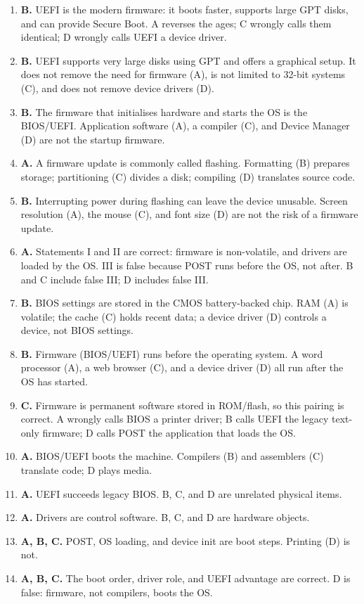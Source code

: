\documentclass[11pt]{article}
\begin{document}
\begin{enumerate}[label=\textbf{Q\arabic*.}, leftmargin=*]
  and application are running, so it is not a BIOS function. Running POST
  (A), initialising hardware (B), and loading the OS (C) are all BIOS jobs.
\item \textbf{B.} UEFI is the modern firmware: it boots faster, supports
  large GPT disks, and can provide Secure Boot. A reverses the ages; C
  wrongly calls them identical; D wrongly calls UEFI a device driver.
\item \textbf{B.} UEFI supports very large disks using GPT and offers a
  graphical setup. It does not remove the need for firmware (A), is not
  limited to 32-bit systems (C), and does not remove device drivers (D).
\item \textbf{B.} The firmware that initialises hardware and starts the OS
  is the BIOS/UEFI. Application software (A), a compiler (C), and Device
  Manager (D) are not the startup firmware.
\item \textbf{A.} A firmware update is commonly called flashing. Formatting
  (B) prepares storage; partitioning (C) divides a disk; compiling (D)
  translates source code.
\item \textbf{B.} Interrupting power during flashing can leave the device
  unusable. Screen resolution (A), the mouse (C), and font size (D) are not
  the risk of a firmware update.
\item \textbf{A.} Statements I and II are correct: firmware is non-volatile,
  and drivers are loaded by the OS. III is false because POST runs before
  the OS, not after. B and C include false III; D includes false III.
\item \textbf{B.} BIOS settings are stored in the CMOS battery-backed chip.
  RAM (A) is volatile; the cache (C) holds recent data; a device driver (D)
  controls a device, not BIOS settings.
\item \textbf{B.} Firmware (BIOS/UEFI) runs before the operating system. A
  word processor (A), a web browser (C), and a device driver (D) all run
  after the OS has started.
\item \textbf{C.} Firmware is permanent software stored in ROM/flash, so this
  pairing is correct. A wrongly calls BIOS a printer driver; B calls UEFI
  the legacy text-only firmware; D calls POST the application that loads the
  OS.

\item \textbf{A.} BIOS/UEFI boots the machine. Compilers (B) and assemblers (C) translate code; D plays media.
\item \textbf{A.} UEFI succeeds legacy BIOS. B, C, and D are unrelated physical items.
\item \textbf{A.} Drivers are control software. B, C, and D are hardware objects.
\item \textbf{A, B, C.} POST, OS loading, and device init are boot steps. Printing (D) is not.
\item \textbf{A, B, C.} The boot order, driver role, and UEFI advantage are correct. D is false: firmware, not compilers, boots the OS.
\end{enumerate}
\def\JKSSBLessonID{46}\def\JKSSBAnswers{1}
\end{document}
